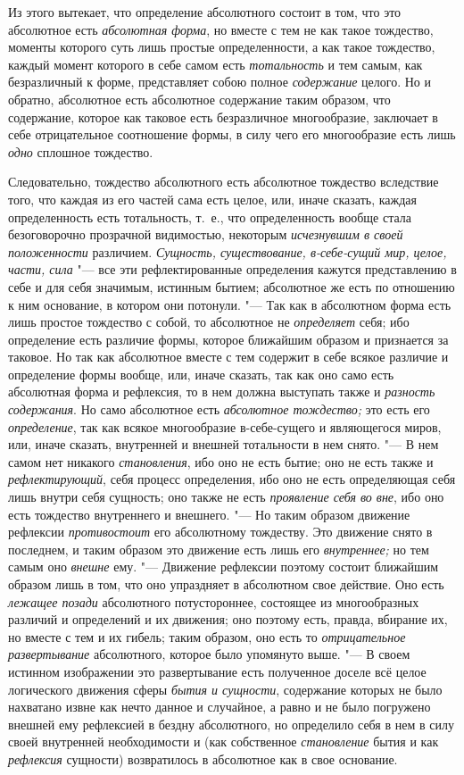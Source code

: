 Из этого вытекает, что определение абсолютного состоит в том, что это
абсолютное есть {\em абсолютная форма}, но вместе с тем
не как такое тождество, моменты которого суть лишь простые определенности,
а как такое тождество, каждый момент которого в себе самом есть
{\em тотальность} и тем самым, как безразличный к
форме, представляет собою полное {\em содержание}
целого. Но и обратно, абсолютное есть абсолютное содержание таким образом,
что содержание, которое как таковое есть безразличное многообразие,
заключает в себе отрицательное соотношение формы, в силу чего его
многообразие есть лишь {\em одно} сплошное тождество.

Следовательно, тождество абсолютного есть абсолютное тождество вследствие
того, что каждая из его частей сама есть целое, или, иначе сказать, каждая
определенность есть тотальность, т.~е., что определенность вообще стала
безоговорочно прозрачной видимостью, некоторым
{\em исчезнувшим в своей положенности} различием.
{\em Сущность, существование, в-себе-сущий мир, целое,
части, сила} "--- все эти рефлектированные определения кажутся представлению в
себе и для себя значимым, истинным бытием; абсолютное же есть по отношению
к ним основание, в котором они потонули. "--- Так как в абсолютном форма есть
лишь простое тождество с собой, то абсолютное не
{\em определяет} себя; ибо определение есть различие
формы, которое ближайшим образом и признается за таковое. Но так как
абсолютное вместе с тем содержит в себе всякое различие и определение формы
вообще, или, иначе сказать, так как оно само есть абсолютная форма и
рефлексия, то в нем должна выступать также и
{\em разность содержания}. Но само абсолютное есть
{\em абсолютное тождество;} это есть его
{\em определение}, так как всякое многообразие
в-себе-сущего и являющегося миров, или, иначе сказать, внутренней и внешней
тотальности в нем снято. "--- В нем самом нет никакого
{\em становления}, ибо оно не есть бытие; оно не есть
также и {\em рефлектирующий}, себя процесс определения,
ибо оно не есть определяющая себя лишь внутри себя сущность; оно также не
есть {\em проявление себя во вне}, ибо оно есть
тождество внутреннего и внешнего. "--- Но таким образом движение рефлексии
{\em противостоит} его абсолютному тождеству. Это
движение снято в последнем, и таким образом это движение есть лишь его
{\em внутреннее;} но тем самым оно
{\em внешне} ему. "--- Движение рефлексии поэтому состоит
ближайшим образом лишь в том, что оно упраздняет в абсолютном свое
действие. Оно есть {\em лежащее позади} абсолютного
потустороннее, состоящее из многообразных различий и определений и их
движения; оно поэтому есть, правда, вбирание их, но вместе с тем и их
гибель; таким образом, оно есть то {\em отрицательное
развертывание} абсолютного, которое было упомянуто выше. "--- В своем истинном
изображении это развертывание есть полученное доселе всё целое логического
движения сферы {\em бытия и сущности}, содержание
которых не было нахватано извне как нечто данное и случайное, а равно и не
было погружено внешней ему рефлексией в бездну абсолютного, но определило
себя в нем в силу своей внутренней необходимости и (как собственное
{\em становление} бытия и как
{\em рефлексия} сущности) возвратилось в абсолютное как
в свое основание.

